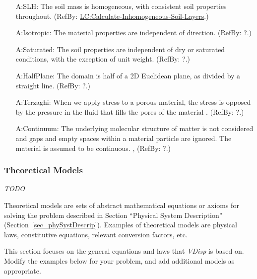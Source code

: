 \documentclass[12pt]{article}
\begin{document}
\begin{itemize}
  
  \item[A:SLH:\phantomsection\label{A:SLH}]{The soil mass is homogeneous,
  with consistent soil properties throughout. (RefBy:
  \hyperref[LC_inhomogeneous]{LC:Calculate-Inhomogeneous-Soil-Layers}.)}

  \item[A:Isotropic:\phantomsection\label{A:Isotropic}]{The material properties are independent of direction. (RefBy: ?.)}

  \item [A:Saturated:\phantomsection\label{A:Saturated}]{The soil properties are
  independent of dry or saturated conditions, with the exception of unit weight.
  (RefBy: ?.)}
          
  \item [A:HalfPlane:\phantomsection\label{A:HalfPlane}]{The domain is half of a
  2D Euclidean plane, as divided by a straight line. (RefBy: ?.)}

  \item [A:Terzaghi:\phantomsection\label{A:Terzaghi}]{When we apply stress to a
  porous material, the stress is opposed by the pressure in the fluid that fills
  the pores of the material \citep{WikipediaTerzaghi2022}. (RefBy: ?.)}

  \item [A:Continuum:\phantomsection\label{A:Continuum}]{The underlying molecular structure of matter is not considered and gaps and empty spaces within a material particle are ignored. The material is assumed to be continuous. \citep[p.\ 33--34]{Long1961}, \citep[p.\ 1-2]{Malvern1969} (RefBy: ?.)}

\end{itemize}
  
\subsubsection{Theoretical Models}\label{sec_theoretical}

\emph{TODO}

Theoretical models are sets of abstract mathematical equations or axioms for
solving the problem described in Section ``Physical System Description''
(Section~\ref{sec_phySystDescrip}). Examples of theoretical models are physical
laws, constitutive equations, relevant conversion factors, etc.

This section focuses on the general equations and laws that \emph{VDisp}{} is
based on.  Modify the examples below for your problem, and add additional models
as appropriate.
\end{document}
